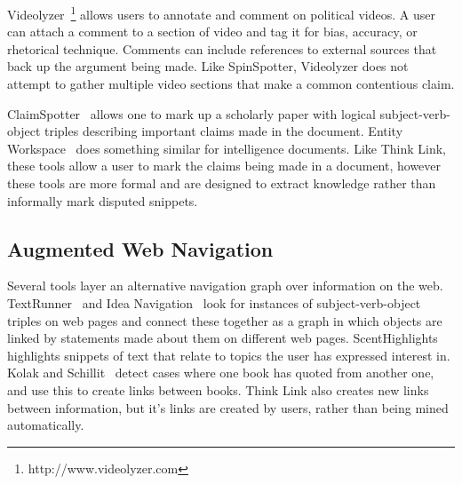 \documentclass{chi2009}
\newcommand{\todo}[1]{}
\begin{document}
Videolyzer~\cite{Diakopoulos2008}\footnote{http://www.videolyzer.com} allows users to annotate and comment on political videos. A user can attach a comment to a section of video and tag it for bias, accuracy, or rhetorical technique. Comments can include references to external sources that back up the argument being made. Like SpinSpotter, Videolyzer does not attempt to gather multiple video sections that make a common contentious claim.

ClaimSpotter~\cite{Sereno2005,Sereno2004} allows one to mark up a scholarly paper with logical subject-verb-object triples describing important claims made in the document. Entity Workspace~\cite{Bier2006} does something similar for intelligence documents. Like Think Link, these tools allow a user to mark the claims being made in a document, however these tools are more formal and are designed to extract knowledge rather than informally mark disputed snippets.

\todo{Ask Nicholas if he would like to read the paper}

\subsection{Augmented Web Navigation}

Several tools layer an alternative navigation graph over information on the web. TextRunner~\cite{Etzioni2008} and Idea Navigation~\cite{Etzioni2008} look for instances of subject-verb-object triples on web pages and connect these together as a graph in which objects are linked by statements made about them on different web pages. ScentHighlights~\cite{Chi2005a} highlights snippets of text that relate to topics the user has expressed interest in. Kolak and Schillit~\cite{Kolak2008} detect cases where one book has quoted from another one, and use this to create links between books. Think Link also creates new links between information, but it's links are created by users, rather than being mined automatically.


% 

% 
\end{document}
